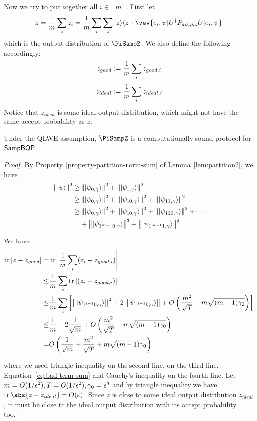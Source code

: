 Now we try to put together all $i\in [m]$. First let
$$z=\frac{1}{m} \sum_i z_i= \frac{1}{m} \sum_i \sum_z \proj{z} \cdot \vev{e_i,\psi|U^\dag P_{acc,i,z} U|e_i,\psi}$$
which is the output distribution of $\PiSampZ$.
We also define the following accordingly:
$$z_{good}:= \frac{1}{m}\sum_i z_{good,i}$$
$$z_{ideal}:= \frac{1}{m}\sum_i z_{ideal,i}$$
Notice that $z_{ideal}$ is some ideal output distribution, which might not have the same accept probability as $z$.

\begin{theorem}
	Under the QLWE assumption, $\PiSampZ$ is a computationally sound protocol for $\operatorname{\mathsf{SampBQP}}$.
\end{theorem}
\begin{proof}
	By Property~\ref{property-partition-norm-sum} of Lemma~\ref{lem:partition2}, we have
	\begin{align} \label{eq:bad-term-sum}
		\left\lVert\ket{\psi}\right\rVert^2 \geq& \left\lVert\ket{\psi_{0,\gamma}}\right\rVert^2+\left\lVert\ket{\psi_{1,\gamma}}\right\rVert^2 \nonumber \\
		\geq& \left\lVert\ket{\psi_{0,\gamma}}\right\rVert^2+
		\left\lVert\ket{\psi_{10,\gamma}}\right\rVert^2+ \left\lVert\ket{\psi_{11,\gamma}}\right\rVert^2 \nonumber \\
		\geq& \left\lVert\ket{\psi_{0,\gamma}}\right\rVert^2+
		\left\lVert\ket{\psi_{10,\gamma}}\right\rVert^2+ \left\lVert\ket{\psi_{110,\gamma}}\right\rVert^2 +\cdots  \nonumber \\
		&+ \left\lVert\ket{\psi_{1^{m-1}0,\gamma}}\right\rVert^2+ \left\lVert\ket{\psi_{1^{m-1}1,\gamma}}\right\rVert^2
	\end{align}

	We have
	\begin{align} \label{eq:z-z-good}
		\tr|z-z_{good}| =& \tr\L|\frac{1}{m}\sum_i (z_i-z_{good,i})\R| \nn \\
		\leq&  \frac{1}{m}\sum_i\tr| (z_i-z_{good,i})| \nn \\
		\leq&  \frac{1}{m}\sum_i\L[\norm{\ket{\psi_{1^{i-1}0,\gamma}}}^2+ 2\norm{\ket{\psi_{1^{i-1}0,\gamma}}}+O\L(\frac{m^2}{\sqrt T}+m\sqrt{(m-1)\gamma_0}\R)\R] \nn \\%
		\leq&  \frac{1}{m}+ 2\frac{1}{\sqrt m}+O\L(\frac{m^2}{\sqrt T}+m\sqrt{(m-1)\gamma_0}\R) \nn \\ %
		=&O\L( \frac{1}{\sqrt m}+\frac{m^2}{\sqrt T}+m\sqrt{(m-1)\gamma_0}\R)
	\end{align}

	where we used triangle inequality on the second line,  on the third line, Equation~\ref{eq:bad-term-sum} and Cauchy's inequality on the fourth line.
	Let $m=O(1/\epsilon^2), T=O(1/\epsilon^2),\gamma_0=\epsilon^8$ and by triangle inequality we have $\tr\abs{z-z_{ideal}}=O(\varepsilon)$.
	Since $z$ is close to some ideal output distribution $z_{ideal}$, it must be close to the ideal output distribution with its accept probability too.
\end{proof}
